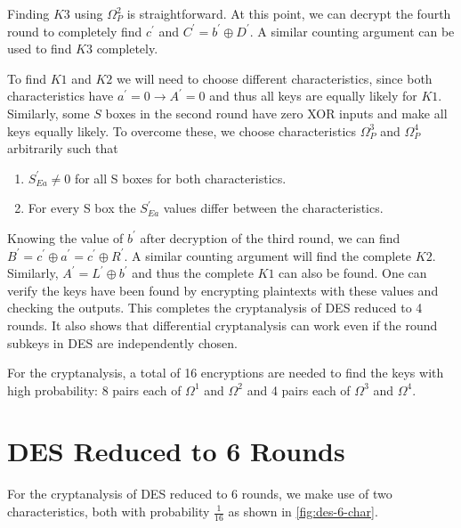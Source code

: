 \documentclass[twoside]{article}
\begin{document}
Finding \(K3\) using \(\Omega_P^2\) is straightforward. At this point, we can
decrypt the fourth round to completely find \(c^\prime\) and \(C^\prime =
b^\prime \oplus D^\prime\). A similar counting argument can be used to find
\(K3\) completely.

To find \(K1\) and \(K2\) we will need to choose different characteristics,
since both characteristics have \(a^\prime = 0 \rightarrow A^\prime = 0\) and
thus all keys are equally likely for \(K1\). Similarly, some \(S\) boxes in the
second round have zero XOR inputs and make all keys equally likely. To overcome
these, we choose characteristics \(\Omega_P^3\) and \(\Omega_P^4\) arbitrarily
such that
\begin{enumerate}
    \item \(S^\prime_{Ea} \neq 0\) for all S boxes for both characteristics.
    \item For every S box the \(S^\prime_{Ea}\) values differ between the
    characteristics.
\end{enumerate}

Knowing the value of \(b^\prime\) after decryption of the third round, we can
find \(B^\prime = c^\prime \oplus a^\prime = c^\prime \oplus R^\prime\). A
similar counting argument will find the complete \(K2\). Similarly, \(A^\prime =
L^\prime \oplus b^\prime\) and thus the complete \(K1\) can also be found. One
can verify the keys have been found by encrypting plaintexts with these values
and checking the outputs. This completes the cryptanalysis of DES reduced to 4
rounds. It also shows that differential cryptanalysis can work even if the round
subkeys in DES are independently chosen.

For the cryptanalysis, a total of 16 encryptions are needed to find the keys
with high probability: 8 pairs each of \(\Omega^1\) and \(\Omega^2\) and 4 pairs
each of \(\Omega^3\) and \(\Omega^4\).

\section{DES Reduced to 6 Rounds}

For the cryptanalysis of DES reduced to 6 rounds, we make use of two
characteristics, both with probability \(\frac{1}{16}\) as shown in
\autoref{fig:des-6-char}.
\end{document}
